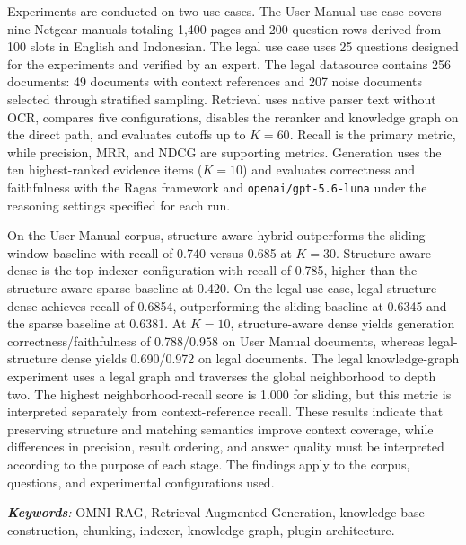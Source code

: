 \begin{singlespace}
    Experiments are conducted on two use cases. The User Manual use case covers nine Netgear manuals totaling 1,400 pages and 200 question rows derived from 100 slots in English and Indonesian. The legal use case uses 25 questions designed for the experiments and verified by an expert. The legal datasource contains 256 documents: 49 documents with context references and 207 noise documents selected through stratified sampling. Retrieval uses native parser text without OCR, compares five configurations, disables the reranker and knowledge graph on the direct path, and evaluates cutoffs up to $K = 60$. Recall is the primary metric, while precision, MRR, and NDCG are supporting metrics. Generation uses the ten highest-ranked evidence items ($K = 10$) and evaluates correctness and faithfulness with the Ragas framework and \texttt{openai/gpt-5.6-luna} under the reasoning settings specified for each run.

    On the User Manual corpus, structure-aware hybrid outperforms the sliding-window baseline with recall of 0.740 versus 0.685 at $K = 30$. Structure-aware dense is the top indexer configuration with recall of 0.785, higher than the structure-aware sparse baseline at 0.420. On the legal use case, legal-structure dense achieves recall of 0.6854, outperforming the sliding baseline at 0.6345 and the sparse baseline at 0.6381. At $K = 10$, structure-aware dense yields generation correctness/faithfulness of 0.788/0.958 on User Manual documents, whereas legal-structure dense yields 0.690/0.972 on legal documents. The legal knowledge-graph experiment uses a legal graph and traverses the global neighborhood to depth two. The highest neighborhood-recall score is 1.000 for sliding, but this metric is interpreted separately from context-reference recall. These results indicate that preserving structure and matching semantics improve context coverage, while differences in precision, result ordering, and answer quality must be interpreted according to the purpose of each stage. The findings apply to the corpus, questions, and experimental configurations used.

    \textit{\textbf{Keywords}:} OMNI-RAG, Retrieval-Augmented Generation, knowledge-base construction, chunking, indexer, knowledge graph, plugin architecture.
\end{singlespace}

\clearpage
